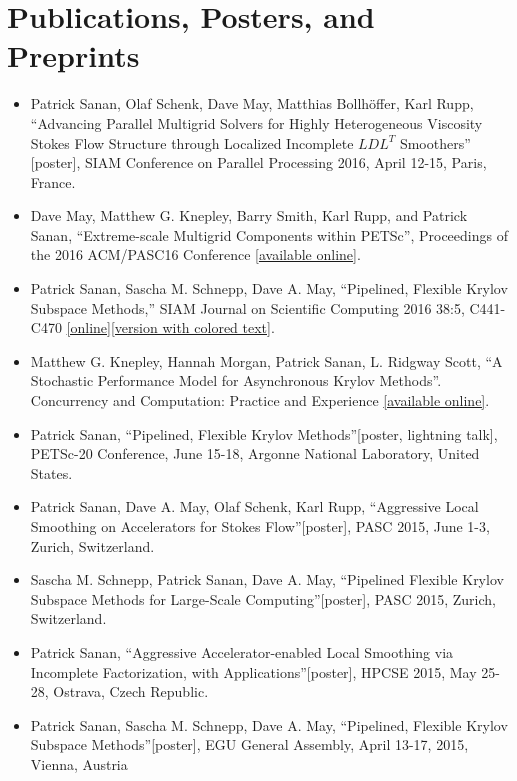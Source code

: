 \documentclass[12pt]{article}
\begin{document}
\section*{Publications, Posters, and Preprints}
\begin{itemize}
\item Patrick Sanan, Olaf Schenk, Dave May, Matthias Bollh\"{o}ffer, Karl Rupp, ``Advancing Parallel Multigrid Solvers for Highly Heterogeneous Viscosity Stokes Flow Structure through Localized Incomplete $LDL^T$ Smoothers'' [poster], SIAM Conference on Parallel Processing 2016, April 12-15, Paris, France.
\item Dave May, Matthew G. Knepley, Barry Smith, Karl Rupp, and Patrick Sanan, ``Extreme-scale Multigrid Components within PETSc'', Proceedings of the 2016 ACM/PASC16 Conference [\href{http://dl.acm.org/citation.cfm?doid=2929908.2929913}{available online}].
\item Patrick Sanan, Sascha M. Schnepp, Dave A. May, ``Pipelined, Flexible Krylov Subspace Methods,'' SIAM Journal on Scientific Computing 2016 38:5, C441-C470 \href{http://dx.doi.org/10.1137/15M1049130}{[online]}\href{http://arxiv.org/abs/1511.07226}{[version with colored text]}.
\item Matthew G. Knepley, Hannah Morgan, Patrick Sanan, L. Ridgway Scott, ``A Stochastic Performance Model for Asynchronous Krylov Methods''. Concurrency and Computation: Practice and Experience \href{http://onlinelibrary.wiley.com/doi/10.1002/cpe.3820/full}{[available online]}.
\item Patrick Sanan, ``Pipelined, Flexible Krylov Methods''[poster, lightning talk], PETSc-20 Conference, June 15-18, Argonne National Laboratory, United States.
\item Patrick Sanan, Dave A. May, Olaf Schenk, Karl Rupp, ``Aggressive Local Smoothing on Accelerators for Stokes Flow''[poster], PASC 2015, June 1-3, Zurich, Switzerland.
\item Sascha M. Schnepp, Patrick Sanan, Dave A. May, ``Pipelined Flexible Krylov Subspace Methods for Large-Scale Computing''[poster], PASC 2015, Zurich, Switzerland.
\item Patrick Sanan, ``Aggressive Accelerator-enabled Local Smoothing via Incomplete Factorization, with Applications''[poster], HPCSE 2015, May 25-28, Ostrava, Czech Republic.
\item Patrick Sanan, Sascha M. Schnepp, Dave A. May, ``Pipelined, Flexible Krylov Subspace Methods''[poster], EGU General Assembly, April 13-17, 2015, Vienna, Austria 

\end{itemize}
\end{document}
